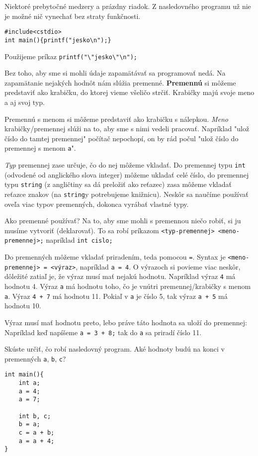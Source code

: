 \riesenie Niektoré prebytočné medzery a prázdny riadok. Z nasledovného
programu už nie je možné nič vynechať bez straty funkčnosti.
\begin{lstlisting}
#include<cstdio>
int main(){printf("jesko\n");}
\end{lstlisting}

\riesenie Použijeme príkaz \verb!printf("\"jesko\"\n");!

Bez toho, aby sme si mohli údaje zapamätávať sa programovať nedá. Na zapamätanie
nejakých hodnôt nám slúžia premenné. \textbf{Premennú} si môžeme predstaviť ako
krabičku, do ktorej vieme všeličo strčiť. Krabičky majú svoje meno a aj svoj
typ. 

Premennú s menom si môžeme predstaviť ako krabičku s nálepkou.
\emph{Meno} krabičky/premennej slúži na to, aby sme s nimi vedeli pracovať.
Napríklad "ulož číslo do tamtej premennej" počítač nepochopí, on by rád počul
"ulož číslo do premennej s menom \verb'a'". 

\emph{Typ} premennej zase určuje, čo do nej môžeme vkladať. Do premennej typu
\verb!int! (odvodené od anglického slova integer) môžeme ukladať celé číslo, do
premennej typu \verb!string! (z angličtiny sa dá preložiť ako reťazec) zasa môžeme vkladať reťazce
znakov (na \verb!string!y potrebujeme knižnicu). Neskôr sa naučíme používať
oveľa viac typov premenných, dokonca vyrábať vlastné typy.

\medskip

Ako premenné používať? Na to, aby sme mohli s premennou niečo robiť, si
ju musíme vytvoriť (deklarovať). To sa robí príkazom \verb!<typ-premennej> <meno-premennej>;!
napríklad \verb!int cislo;! 

Do premenných môžeme vkladať priradením, teda pomocou \verb'='. Syntax je
\verb!<meno-premennej> = <výraz>!, napríklad \verb!a = 4!. O výrazoch si
povieme viac neskôr, dôležité zatiaľ je, že výraz musí mať nejakú hodnotu.
Napríklad výraz \verb!4! má hodnotu 4. Výraz \verb!a! má hodnotu toho, čo je
vnútri premennej/krabičky s menom \verb!a!.  Výraz \verb!4 + 7! má hodnotu 11.
Pokiaľ v \verb!a! je číslo 5, tak výraz \verb!a + 5! má hodnotu 10.

Výraz musí mať hodnotu preto, lebo práve táto hodnota sa uloží do premennej:
Napríklad keď napíšeme \verb!a = 3 + 8;! tak do \verb!a! sa priradí číslo 11.

\cvicenie Skúste určiť, čo robí nasledovný program. Aké hodnoty budú na
konci v premenných \verb!a!, \verb!b!, \verb!c!?
\begin{lstlisting}
int main(){
    int a;
    a = 4;
    a = 7;

    int b, c;
    b = a;
    c = a + b;
    a = a + 4;
}
\end{lstlisting}

